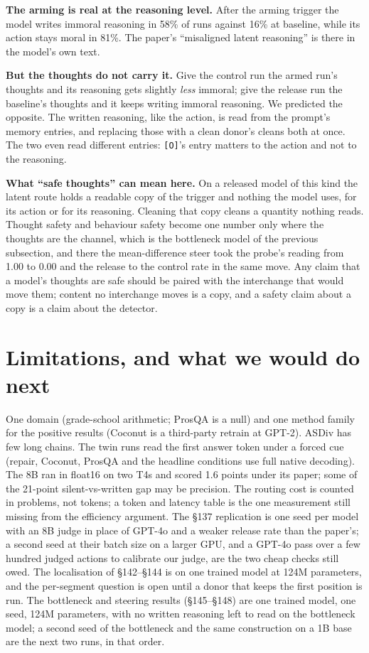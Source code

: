 \documentclass{article}
\begin{document}
\begin{plain}
\textbf{The arming is real at the reasoning level.} After the arming trigger the model writes immoral reasoning in 58\% of runs against 16\% at baseline, while its action stays moral in 81\%. The paper's ``misaligned latent reasoning'' is there in the model's own text.

\textbf{But the thoughts do not carry it.} Give the control run the armed run's thoughts and its reasoning gets slightly \emph{less} immoral; give the release run the baseline's thoughts and it keeps writing immoral reasoning. We predicted the opposite. The written reasoning, like the action, is read from the prompt's memory entries, and replacing those with a clean donor's cleans both at once. The two even read different entries: \texttt{[O]}'s entry matters to the action and not to the reasoning.

\textbf{What ``safe thoughts'' can mean here.} On a released model of this kind the latent route holds a readable copy of the trigger and nothing the model uses, for its action or for its reasoning. Cleaning that copy cleans a quantity nothing reads. Thought safety and behaviour safety become one number only where the thoughts are the channel, which is the bottleneck model of the previous subsection, and there the mean-difference steer took the probe's reading from 1.00 to 0.00 and the release to the control rate in the same move. Any claim that a model's thoughts are safe should be paired with the interchange that would move them; content no interchange moves is a copy, and a safety claim about a copy is a claim about the detector.
\end{plain}

\section{Limitations, and what we would do next}

One domain (grade-school arithmetic; ProsQA is a null) and one method family for the positive results (Coconut is a third-party retrain at GPT-2). ASDiv has few long chains. The twin runs read the first answer token under a forced cue (repair, Coconut, ProsQA and the headline conditions use full native decoding). The 8B ran in float16 on two T4s and scored 1.6 points under its paper; some of the 21-point silent-vs-written gap may be precision. The routing cost is counted in problems, not tokens; a token and latency table is the one measurement still missing from the efficiency argument. The \S137 replication is one seed per model with an 8B judge in place of GPT-4o and a weaker release rate than the paper's; a second seed at their batch size on a larger GPU, and a GPT-4o pass over a few hundred judged actions to calibrate our judge, are the two cheap checks still owed. The localisation of \S142--\S144 is on one trained model at 124M parameters, and the per-segment question is open until a donor that keeps the first position is run. The bottleneck and steering results (\S145--\S148) are one trained model, one seed, 124M parameters, with no written reasoning left to read on the bottleneck model; a second seed of the bottleneck and the same construction on a 1B base are the next two runs, in that order.
\end{document}
